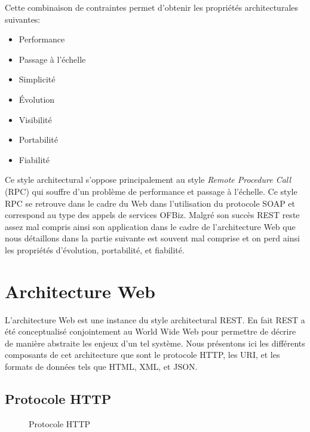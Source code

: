 \documentclass[a4paper, 11pt]{report}
\begin{document}
Cette combinaison de contraintes permet d'obtenir les propriétés
architecturales suivantes:
\begin{itemize}
\item Performance
\item Passage à l'échelle
\item Simplicité
\item Évolution
\item Visibilité
\item Portabilité
\item Fiabilité
\end{itemize}

Ce style architectural s'oppose principalement au style \emph{Remote
  Procedure Call} (RPC) qui souffre d'un problème de performance et
passage à l'échelle. Ce style RPC se retrouve dans le cadre du Web
dans l'utilisation du protocole SOAP \cite{box2000simple} et
correspond au type des appels de services OFBiz. Malgré son succès
REST reste assez mal compris ainsi son application dans le cadre de
l'architecture Web que nous détaillons dans la partie suivante est
souvent mal comprise et on perd ainsi les propriétés d'évolution,
portabilité, et fiabilité.

\section{Architecture Web}

L'architecture Web est une instance du style architectural REST. En
fait REST a été conceptualisé conjointement au World Wide Web pour
permettre de décrire de manière abstraite les enjeux d'un tel système.
Nous présentons ici les différents composants de cet architecture que
sont le protocole HTTP, les URI, et les formats de données tels que
HTML, XML, et JSON.

\subsection{Protocole HTTP}

\begin{figure}
  \centering
  \caption{Protocole HTTP}
  \label{fig:http}
\end{figure}
\end{document}
